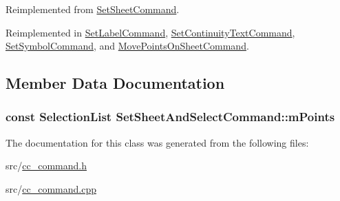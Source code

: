 Reimplemented from \hyperlink{a00134_a027700275d409b94185dfb3aa2d792bb}{Set\-Sheet\-Command}.



Reimplemented in \hyperlink{a00127_a1b03e239de9656b4fabe64f52ef502bb}{Set\-Label\-Command}, \hyperlink{a00124_a8545ed7f5c3ca572042c4a0abc8c2491}{Set\-Continuity\-Text\-Command}, \hyperlink{a00137_ac01aa3b3a02f3a8db5b16e9cbb1c3228}{Set\-Symbol\-Command}, and \hyperlink{a00112_a2339b105a336b22d59771534a3f4a304}{Move\-Points\-On\-Sheet\-Command}.



\subsection{Member Data Documentation}
\hypertarget{a00132_aca82abd26c7fb4cdf0b6329b5fecdb42}{
\subsubsection[{m\-Points}]{\setlength{\rightskip}{0pt plus 5cm}const {\bf Selection\-List} Set\-Sheet\-And\-Select\-Command\-::m\-Points\hspace{0.3cm}{\ttfamily [protected]}}}\label{a00132_aca82abd26c7fb4cdf0b6329b5fecdb42}


The documentation for this class was generated from the following files\-:\begin{DoxyCompactItemize}
\item 
src/\hyperlink{a00183}{cc\-\_\-command.\-h}\item 
src/\hyperlink{a00182}{cc\-\_\-command.\-cpp}\end{DoxyCompactItemize}
